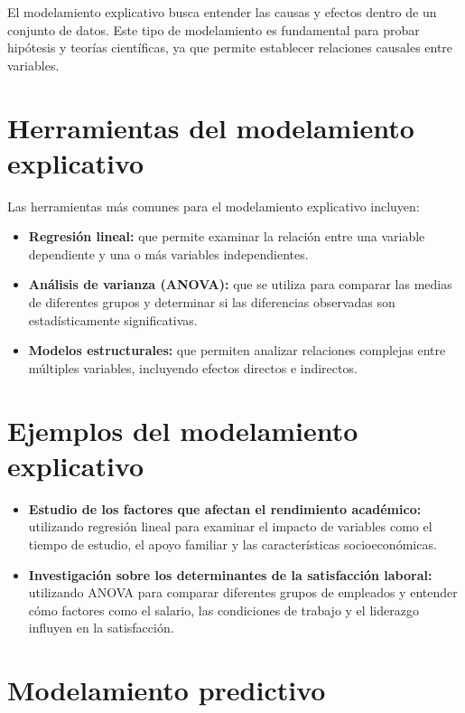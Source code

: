 \documentclass[
  letterpaper,
  DIV=11,
  numbers=noendperiod]{scrreprt}
\providecommand{\tightlist}{%
  \setlength{\itemsep}{0pt}\setlength{\parskip}{0pt}}\usepackage{longtable,booktabs,array}
\begin{document}
El modelamiento explicativo busca entender las causas y efectos dentro
de un conjunto de datos. Este tipo de modelamiento es fundamental para
probar hipótesis y teorías científicas, ya que permite establecer
relaciones causales entre variables.

\section{Herramientas del modelamiento
explicativo}\label{herramientas-del-modelamiento-explicativo}

Las herramientas más comunes para el modelamiento explicativo incluyen:

\begin{itemize}
\tightlist
\item
  \textbf{Regresión lineal:} que permite examinar la relación entre una
  variable dependiente y una o más variables independientes.
\item
  \textbf{Análisis de varianza (ANOVA):} que se utiliza para comparar
  las medias de diferentes grupos y determinar si las diferencias
  observadas son estadísticamente significativas.
\item
  \textbf{Modelos estructurales:} que permiten analizar relaciones
  complejas entre múltiples variables, incluyendo efectos directos e
  indirectos.
\end{itemize}

\section{Ejemplos del modelamiento
explicativo}\label{ejemplos-del-modelamiento-explicativo}

\begin{itemize}
\tightlist
\item
  \textbf{Estudio de los factores que afectan el rendimiento académico:}
  utilizando regresión lineal para examinar el impacto de variables como
  el tiempo de estudio, el apoyo familiar y las características
  socioeconómicas.
\item
  \textbf{Investigación sobre los determinantes de la satisfacción
  laboral:} utilizando ANOVA para comparar diferentes grupos de
  empleados y entender cómo factores como el salario, las condiciones de
  trabajo y el liderazgo influyen en la satisfacción.
\end{itemize}

\section{Modelamiento predictivo}\label{modelamiento-predictivo}
\end{document}
